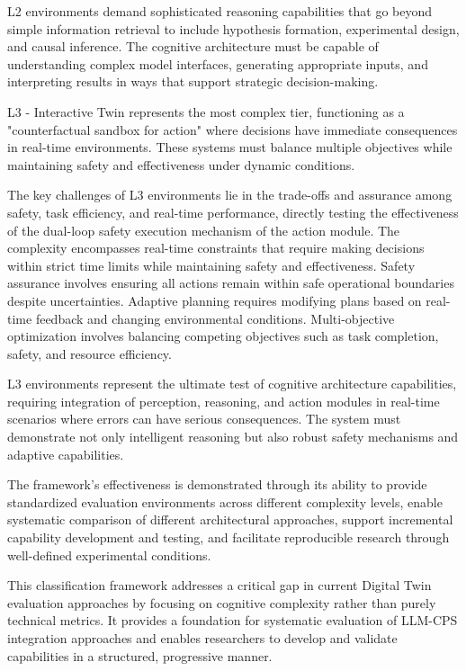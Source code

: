 L2 environments demand sophisticated reasoning capabilities that go beyond simple information retrieval to include hypothesis formation, experimental design, and causal inference. The cognitive architecture must be capable of understanding complex model interfaces, generating appropriate inputs, and interpreting results in ways that support strategic decision-making.

L3 - Interactive Twin represents the most complex tier, functioning as a "counterfactual sandbox for action" where decisions have immediate consequences in real-time environments. These systems must balance multiple objectives while maintaining safety and effectiveness under dynamic conditions.

The key challenges of L3 environments lie in the trade-offs and assurance among safety, task efficiency, and real-time performance, directly testing the effectiveness of the dual-loop safety execution mechanism of the action module. The complexity encompasses real-time constraints that require making decisions within strict time limits while maintaining safety and effectiveness. Safety assurance involves ensuring all actions remain within safe operational boundaries despite uncertainties. Adaptive planning requires modifying plans based on real-time feedback and changing environmental conditions. Multi-objective optimization involves balancing competing objectives such as task completion, safety, and resource efficiency.

L3 environments represent the ultimate test of cognitive architecture capabilities, requiring integration of perception, reasoning, and action modules in real-time scenarios where errors can have serious consequences. The system must demonstrate not only intelligent reasoning but also robust safety mechanisms and adaptive capabilities.

The framework's effectiveness is demonstrated through its ability to provide standardized evaluation environments across different complexity levels, enable systematic comparison of different architectural approaches, support incremental capability development and testing, and facilitate reproducible research through well-defined experimental conditions.

This classification framework addresses a critical gap in current Digital Twin evaluation approaches by focusing on cognitive complexity rather than purely technical metrics. It provides a foundation for systematic evaluation of LLM-CPS integration approaches and enables researchers to develop and validate capabilities in a structured, progressive manner.

